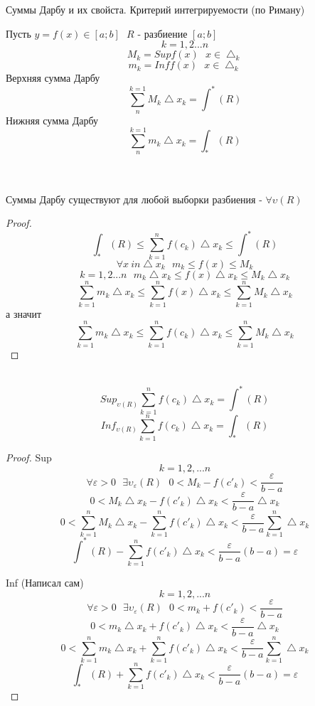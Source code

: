 \begin{title}
  Суммы Дарбу и их свойста. Критерий интегрируемости (по Риману)
\end{title}

Пусть $y = f(x) \in [a; b] ~~~ R$ - разбиение $[a; b]$
\[k = 1, 2 ... n\]
\[M_k = Sup f(x) ~~~ x \in \bigtriangleup_k\]
\[m_k = Inf f(x) ~~~ x \in \bigtriangleup_k\]
Верхняя сумма Дарбу
\[\sum_{n}^{k = 1}M_k \bigtriangleup x_k = \int^* (R)\]
Нижняя сумма Дарбу
\[\sum_{n}^{k = 1}m_k \bigtriangleup x_k = \int_* (R)\]

\\
\\
Суммы Дарбу существуют для любой выборки разбиения - $\forall \upsilon(R)$\\
\begin{proof}
  \[\int_* (R) \le \sum_{k = 1}^{n} f(c_k) \bigtriangleup x_k \le \int^* (R)\]
  \[\forall x \ in \bigtriangleup x_k ~~~ m_k \le f(x) \le M_k\]
  \[k = 1, 2 ... n ~~~ m_k \bigtriangleup x_k \le f(x) \bigtriangleup x_k \le
    M_k \bigtriangleup x_k\]
  \[\sum_{k = 1}^{n} m_k \bigtriangleup x_k \le \sum_{k = 1}^{n} f(x)
    \bigtriangleup x_k \le \sum_{k = 1}^{n} M_k \bigtriangleup x_k\]
  а значит
  \[\sum_{k = 1}^{n} m_k \bigtriangleup x_k \le \sum_{k = 1}^{n} f(c_k)
    \bigtriangleup x_k \le \sum_{k = 1}^{n} M_k \bigtriangleup x_k\]
\end{proof}

\\
\[Sup_{\upsilon (R)} \sum_{k = 1}^{n} f(c_k) \bigtriangleup x_k = \int^* (R)\]
\[Inf_{\upsilon (R)} \sum_{k = 1}^{n} f(c_k) \bigtriangleup x_k = \int_* (R)\]

\begin{proof}
  Sup
  \[k = 1, 2, ... n\]
  \[\forall \varepsilon > 0 ~~~ \exists \upsilon_\varepsilon (R) ~~~ 0 <
    M_k - f(c'_k) < \frac{\varepsilon}{b - a}\]
  \[0 < M_k \bigtriangleup x_k - f(c'_k) \bigtriangleup x_k <
    \frac{\varepsilon}{b - a}\bigtriangleup x_k\]
  \[0 < \sum_{k = 1}^{n} M_k \bigtriangleup x_k - \sum_{k = 1}^{n} f(c'_k)
    \bigtriangleup x_k < \frac{\varepsilon}{b - a} \sum_{k = 1}^{n}
    \bigtriangleup x_k\]
  \[\int^* (R) - \sum_{k = 1}^{n} f(c'_k) \bigtriangleup x_k <
    \frac{\varepsilon}{b - a} (b - a) = \varepsilon\]

  Inf (Написал сам)
  \[k = 1, 2, ... n\]
  \[\forall \varepsilon > 0 ~~~ \exists \upsilon_\varepsilon (R) ~~~ 0 <
  m_k + f(c'_k) < \frac{\varepsilon}{b - a}\]
  \[0 < m_k \bigtriangleup x_k + f(c'_k) \bigtriangleup x_k <
    \frac{\varepsilon}{b - a}\bigtriangleup x_k\]
  \[0 < \sum_{k = 1}^{n} m_k \bigtriangleup x_k + \sum_{k = 1}^{n} f(c'_k)
    \bigtriangleup x_k < \frac{\varepsilon}{b - a} \sum_{k = 1}^{n}
    \bigtriangleup x_k\]
  \[\int_* (R) + \sum_{k = 1}^{n} f(c'_k) \bigtriangleup x_k <
    \frac{\varepsilon}{b - a} (b - a) = \varepsilon\]
\end{proof}

